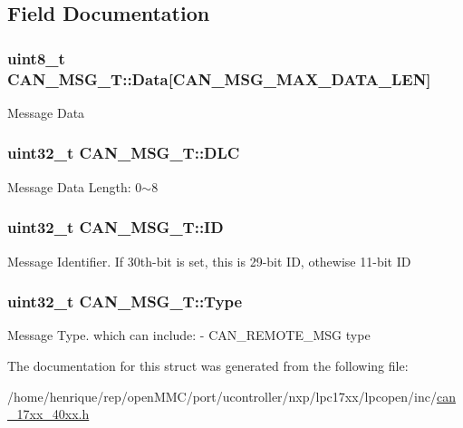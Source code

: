 \subsection{Field Documentation}
\hypertarget{structCAN__MSG__T_adb227f0afb0c340bdc92b4098c2734de}{
\subsubsection[{Data}]{\setlength{\rightskip}{0pt plus 5cm}uint8\-\_\-t C\-A\-N\-\_\-\-M\-S\-G\-\_\-\-T\-::\-Data\mbox{[}{\bf C\-A\-N\-\_\-\-M\-S\-G\-\_\-\-M\-A\-X\-\_\-\-D\-A\-T\-A\-\_\-\-L\-E\-N}\mbox{]}}}\label{structCAN__MSG__T_adb227f0afb0c340bdc92b4098c2734de}
Message Data \hypertarget{structCAN__MSG__T_a39963b19d3cb9885a5e984a6805f2674}{
\subsubsection[{D\-L\-C}]{\setlength{\rightskip}{0pt plus 5cm}uint32\-\_\-t C\-A\-N\-\_\-\-M\-S\-G\-\_\-\-T\-::\-D\-L\-C}}\label{structCAN__MSG__T_a39963b19d3cb9885a5e984a6805f2674}
Message Data Length\-: 0$\sim$8 \hypertarget{structCAN__MSG__T_a7fbb2453bed19c5b143fb7336a697622}{
\subsubsection[{I\-D}]{\setlength{\rightskip}{0pt plus 5cm}uint32\-\_\-t C\-A\-N\-\_\-\-M\-S\-G\-\_\-\-T\-::\-I\-D}}\label{structCAN__MSG__T_a7fbb2453bed19c5b143fb7336a697622}
Message Identifier. If 30th-\/bit is set, this is 29-\/bit I\-D, othewise 11-\/bit I\-D \hypertarget{structCAN__MSG__T_a2c15ca6deba6d985f7d8d24caec2fb3b}{
\subsubsection[{Type}]{\setlength{\rightskip}{0pt plus 5cm}uint32\-\_\-t C\-A\-N\-\_\-\-M\-S\-G\-\_\-\-T\-::\-Type}}\label{structCAN__MSG__T_a2c15ca6deba6d985f7d8d24caec2fb3b}
Message Type. which can include\-: -\/ C\-A\-N\-\_\-\-R\-E\-M\-O\-T\-E\-\_\-\-M\-S\-G type 

The documentation for this struct was generated from the following file\-:\begin{DoxyCompactItemize}
\item 
/home/henrique/rep/open\-M\-M\-C/port/ucontroller/nxp/lpc17xx/lpcopen/inc/\hyperlink{can__17xx__40xx_8h}{can\-\_\-17xx\-\_\-40xx.\-h}\end{DoxyCompactItemize}
